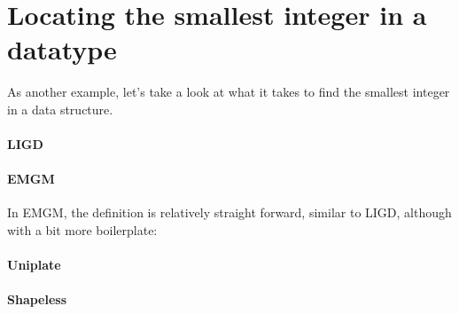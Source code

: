 \section{Locating the smallest integer in a datatype}
As another example, let's take a look at what it takes to find the smallest
integer in a data structure.

\paragraph{LIGD}

\paragraph{EMGM} In EMGM, the definition is relatively straight forward, similar
to LIGD, although with a bit more boilerplate:



\paragraph{Uniplate}

\paragraph{Shapeless}
